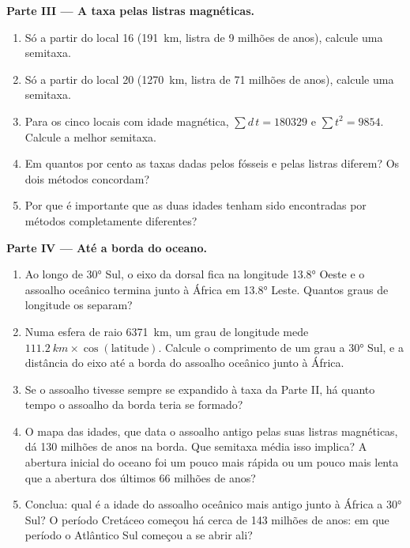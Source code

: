 \begin{problem}
\medskip
\noindent\textbf{Parte III --- A taxa pelas listras magnéticas.}
\begin{enumerate}[resume]
  \item Só a partir do local 16 (\qty{191}{km}, listra de 9 milhões de
        anos), calcule uma semitaxa.
  \item Só a partir do local 20 (\qty{1270}{km}, listra de 71 milhões de
        anos), calcule uma semitaxa.
  \item Para os cinco locais com idade magnética, $\sum d\,t = \num{180329}$
        e $\sum t^2 = \num{9854}$. Calcule a melhor semitaxa.
  \item Em quantos por cento as taxas dadas pelos fósseis e pelas listras
        diferem? Os dois métodos concordam?
  \item Por que é importante que as duas idades tenham sido encontradas por
        métodos completamente diferentes?
\end{enumerate}

\medskip
\noindent\textbf{Parte IV --- Até a borda do oceano.}
\begin{enumerate}[resume]
  \item Ao longo de \ang{30} Sul, o eixo da dorsal fica na longitude
        \ang{13.8} Oeste e o assoalho oceânico termina junto à África em
        \ang{13.8} Leste. Quantos graus de longitude os separam?
  \item Numa esfera de raio \qty{6371}{km}, um grau de longitude mede
        $\qty{111.2}{km} \times \cos(\text{latitude})$. Calcule o
        comprimento de um grau a \ang{30} Sul, e a distância do eixo até a
        borda do assoalho oceânico junto à África.
  \item Se o assoalho tivesse sempre se expandido à taxa da Parte II, há
        quanto tempo o assoalho da borda teria se formado?
  \item O mapa das idades, que data o assoalho antigo pelas suas listras
        magnéticas, dá \num{130} milhões de anos na borda. Que semitaxa média
        isso implica? A abertura inicial do oceano foi um pouco mais rápida
        ou um pouco mais lenta que a abertura dos últimos 66 milhões de
        anos?
  \item Conclua: qual é a idade do assoalho oceânico mais antigo junto à
        África a \ang{30} Sul? O período Cretáceo começou há cerca de
        \num{143} milhões de anos: em que período o Atlântico Sul começou a
        se abrir ali?
\end{enumerate}
\end{problem}
